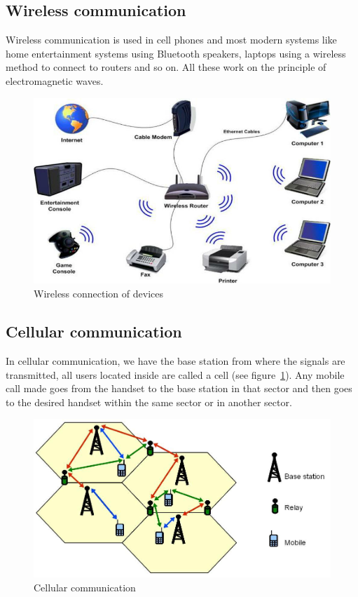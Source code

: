 \subsection{Wireless communication}
Wireless communication is used in cell phones and most modern systems like home entertainment systems using Bluetooth speakers, laptops using a wireless method to connect to routers and so on. All these work on the principle of electromagnetic waves.
\begin{figure}[h]
\centering
\includegraphics[scale=0.3]{./graphics/Expert-support-for-wireless-communication-projects}
\caption{Wireless connection of devices}
\end{figure}

\subsection{Cellular communication} 
In cellular communication, we have the base station from where the signals are transmitted, all users located inside are called a cell (see figure~\ref{fig:rrsadafig1}). Any mobile call made goes from the handset to the base station in that sector and then goes to the desired handset within the same sector or in another sector.
\begin{figure}[h]
\centering
\includegraphics[scale=0.3]{./graphics/RR_sada_fig1}
\caption{Cellular communication}
\label{fig:rrsadafig1}
\end{figure}

